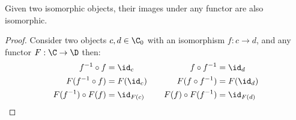 \begin{theorem}\label{thm:isomorphism_functor}

  Given two isomorphic objects, their images under any functor are also
  isomorphic.

  \begin{proof}
    Consider two objects $c,d \in \C_0$ with an isomorphism $f: c\to d$, and any
    functor $F:\C \to \D$ then:
    \[
      \begin{aligned}
        f^{-1}\circ f &= \id_c\\
        F(f^{-1}\circ f) &= F(\id_c)\\
        F(f^{-1})\circ F(f) &= \id_{F(c)}
      \end{aligned}
      \qquad
      \begin{aligned}
        f \circ f^{-1} &= \id_d\\
        F(f \circ f^{-1}) &= F(\id_d)\\
        F(f) \circ F(f^{-1}) &= \id_{F(d)}
      \end{aligned}
    \]
  \end{proof}
\end{theorem}







